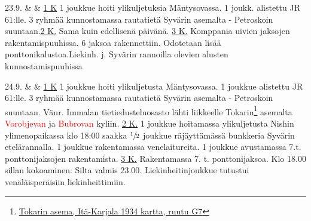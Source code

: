 \documentclass[11pt,a5paper,oneside]{book}
\begin{document}
\taulustop



23.9. & & \underline{1 K} 1 joukkue hoiti ylikuljetuksia Mäntysovassa. 1 joukk. alistettu JR 61:lle. 3 ryhmää kunnostamassa rautatietä Syvärin asemalta - Petroskoin suuntaan.\newline\newline \underline{2 K.} Sama kuin edellisenä päivänä. \newline\newline \underline{3 K.} Komppania uivien jaksojen rakentamispuuhissa. 6 jaksoa rakennettiin. Odotetaan lisää ponttonikalustoa.\newline\newline Liekinh. j. Syvärin rannoilla olevien alusten kunnostamispuuhissa \\

\newpage

24.9. & & \underline{1 K} 1 joukkue hoiti ylikuljetusta Mäntysovassa. 1 joukkue alistettu JR 61:lle. 3 ryhmää kunnostamassa rautatietä Syvärin asemalta - Petroskoin suuntaan. Vänr. Immalan tietiedusteluosasto lähti liikkeelle Tokarin\footnote{\href{https://www.google.com/maps/place/Tokari,+Leningradin+alue,+Ven\%C3\%A4j\%C3\%A4,+187790/@61.0959479,34.3856997,3034m/}{Tokarin asema, Itä-Karjala 1934 kartta, ruutu G7}} asemalta \textcolor{red}{Vorobjevan} ja \textcolor{red}{Bubrovan} kyliin. \newline\newline \underline{2 K.} 1 joukkue hoitamassa ylikuljetusta Nishin ylimenopaikassa klo 18:00 saakka $\sfrac{1}{2}$ joukkue räjäyttämässä bunkkeria Syvärin etelärannalla. 1 joukkue rakentamassa venelaitureita. 1 joukkue avustamassa 7.t. ponttonijaksojen rakentamista. \newline\newline \underline{3 K.} Rakentamassa 7. t. ponttonijaksoa. Klo 18.00 sillan kokoaminen. Silta valmis 23.00. \newline\newline Liekinheitinjoukkue tutustui venäläisperäisiin liekinheittimiin. \\

\taulustop

\end{document}

